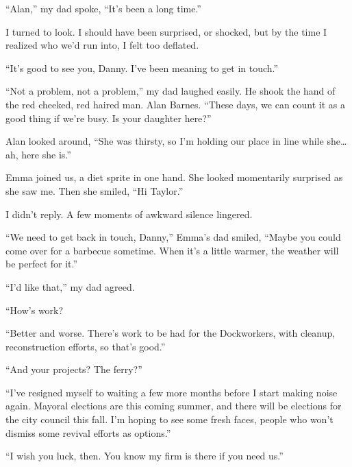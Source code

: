 ``Alan,'' my dad spoke, ``It's been a long time.''



I turned to look.  I should have been surprised, or shocked, but by the time I realized who we'd run into, I felt too deflated.



``It's good to see you, Danny.  I've been meaning to get in touch.''



``Not a problem, not a problem,'' my dad laughed easily.  He shook the hand of the red cheeked, red haired man.  Alan Barnes.  ``These days, we can count it as a good thing if we're busy.  Is your daughter here?''



Alan looked around, ``She was thirsty, so I'm holding our place in line while she\ldots ah, here she is.''



Emma joined us, a diet sprite in one hand.  She looked momentarily surprised as she saw me.  Then she smiled, ``Hi Taylor.''



I didn't reply.  A few moments of awkward silence lingered.



``We need to get back in touch, Danny,'' Emma's dad smiled, ``Maybe you could come over for a barbecue sometime.  When it's a little warmer, the weather will be perfect for it.''



``I'd like that,'' my dad agreed.



``How's work?



``Better and worse.  There's work to be had for the Dockworkers, with cleanup, reconstruction efforts, so that's good.''



``And your projects?  The ferry?''



``I've resigned myself to waiting a few more months before I start making noise again.  Mayoral elections are this coming summer, and there will be elections for the city council this fall.  I'm hoping to see some fresh faces, people who won't dismiss some revival efforts as options.''



``I wish you luck, then.  You know my firm is there if you need us.''



